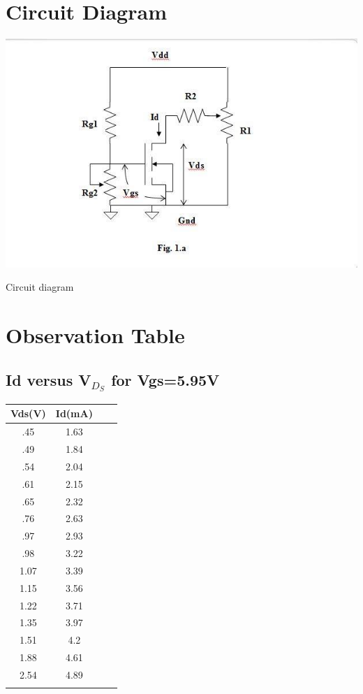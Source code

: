 \documentclass[12pt]{article}
\begin{document}
\section*{Circuit Diagram}
\includegraphics{ckt.jpg}
  \caption{Circuit diagram}
  

\section*{Observation Table}
\subsection{Id versus V$_D_S$ for Vgs=5.95V}
\begin{center}
 \begin{tabular}{|| c c | c c||} 
 \hline
 Vds(V) & Id(mA) \\ [0.5ex] 
 \hline\hline
 .45 & 1.63\\
 \hline
 .49 & 1.84\\
 \hline
 .54 & 2.04\\
 \hline
 .61 & 2.15\\
 \hline
 .65 &2.32\\
 \hline
 .76&2.63\\
 \hline
 .97&2.93\\
 \hline
 .98&3.22\\
 \hline
 1.07&3.39\\
 \hline
 1.15&3.56\\
 \hline
 1.22&3.71\\
 \hline
 1.35&3.97\\
 \hline
 1.51&4.2\\
 \hline
 1.88&4.61\\
 \hline
 2.54&4.89\\
 \hline\\
\end{tabular}
\end{center}
\end{document}
